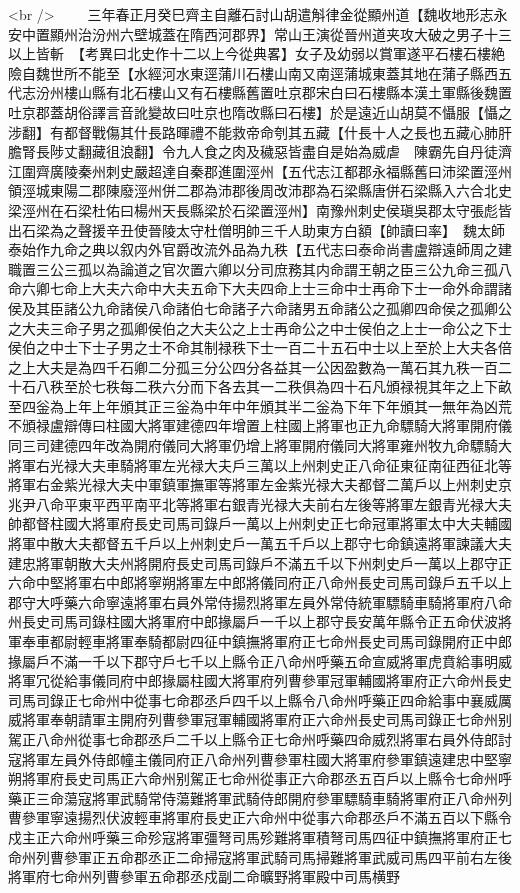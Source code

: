 <br />
　　三年春正月癸巳齊主自離石討山胡遣斛律金從顯州道【魏收地形志永安中置顯州治汾州六壁城蓋在隋西河郡界】常山王演從晉州道夹攻大破之男子十三以上皆斬　【考異曰北史作十二以上今從典畧】女子及幼弱以賞軍遂平石樓石樓絶險自魏世所不能至【水經河水東逕蒲川石樓山南又南逕蒲城東蓋其地在蒲子縣西五代志汾州樓山縣有北石樓山又有石樓縣舊置吐京郡宋白曰石樓縣本漢土軍縣後魏置吐京郡蓋胡俗譯言音訛變故曰吐京也隋改縣曰石樓】於是遠近山胡莫不懾服【懾之涉翻】有都督戰傷其什長路暉禮不能救帝命刳其五藏【什長十人之長也五藏心肺肝膽腎長陟丈翻藏徂浪翻】令九人食之肉及穢惡皆盡自是始為威虐　陳霸先自丹徒濟江圍齊廣陵秦州刺史嚴超達自秦郡進圍涇州【五代志江都郡永福縣舊曰沛梁置涇州領涇城東陽二郡陳廢涇州併二郡為沛郡後周改沛郡為石梁縣唐併石梁縣入六合北史梁涇州在石梁杜佑曰楊州天長縣梁於石梁置涇州】南豫州刺史侯瑱吳郡太守張彪皆出石梁為之聲援辛丑使晉陵太守杜僧明帥三千人助東方白額【帥讀曰率】　魏太師泰始作九命之典以叙内外官爵改流外品為九秩【五代志曰泰命尚書盧辯遠師周之建職置三公三孤以為論道之官次置六卿以分司庶務其内命謂王朝之臣三公九命三孤八命六卿七命上大夫六命中大夫五命下大夫四命上士三命中士再命下士一命外命謂諸侯及其臣諸公九命諸侯八命諸伯七命諸子六命諸男五命諸公之孤卿四命侯之孤卿公之大夫三命子男之孤卿侯伯之大夫公之上士再命公之中士侯伯之上士一命公之下士侯伯之中士下士子男之士不命其制禄秩下士一百二十五石中士以上至於上大夫各倍之上大夫是為四千石卿二分孤三分公四分各益其一公因盈數為一萬石其九秩一百二十石八秩至於七秩每二秩六分而下各去其一二秩俱為四十石凡頒禄視其年之上下畝至四釡為上年上年頒其正三釡為中年中年頒其半二釡為下年下年頒其一無年為凶荒不頒禄盧辯傳曰柱國大將軍建德四年增置上柱國上將軍也正九命驃騎大將軍開府儀同三司建德四年改為開府儀同大將軍仍增上將軍開府儀同大將軍雍州牧九命驃騎大將軍右光禄大夫車騎將軍左光禄大夫戶三萬以上州刺史正八命征東征南征西征北等將軍右金紫光禄大夫中軍鎮軍撫軍等將軍左金紫光禄大夫都督二萬戶以上州刺史京兆尹八命平東平西平南平北等將軍右銀青光禄大夫前右左後等將軍左銀青光禄大夫帥都督柱國大將軍府長史司馬司錄戶一萬以上州刺史正七命冠軍將軍太中大夫輔國將軍中散大夫都督五千戶以上州刺史戶一萬五千戶以上郡守七命鎮遠將軍諫議大夫建忠將軍朝散大夫州將開府長史司馬司錄戶不滿五千以下州刺史戶一萬以上郡守正六命中堅將軍右中郎將寧朔將軍左中郎將儀同府正八命州長史司馬司錄戶五千以上郡守大呼藥六命寧遠將軍右員外常侍揚烈將軍左員外常侍統軍驃騎車騎將軍府八命州長史司馬司錄柱國大將軍府中郎掾屬戶一千以上郡守長安萬年縣令正五命伏波將軍奉車都尉輕車將軍奉騎都尉四征中鎮撫將軍府正七命州長史司馬司錄開府正中郎掾屬戶不滿一千以下郡守戶七千以上縣令正八命州呼藥五命宣威將軍虎賁給事明威將軍冗從給事儀同府中郎掾屬柱國大將軍府列曹參軍冠軍輔國將軍府正六命州長史司馬司錄正七命州中從事七命郡丞戶四千以上縣令八命州呼藥正四命給事中襄威厲威將軍奉朝請軍主開府列曹參軍冠軍輔國將軍府正六命州長史司馬司錄正七命州别駕正八命州從事七命郡丞戶二千以上縣令正七命州呼藥四命威烈將軍右員外侍郎討寇將軍左員外侍郎幢主儀同府正八命州列曹參軍柱國大將軍府參軍鎮遠建忠中堅寧朔將軍府長史司馬正六命州别駕正七命州從事正六命郡丞五百戶以上縣令七命州呼藥正三命蕩寇將軍武騎常侍蕩難將軍武騎侍郎開府參軍驃騎車騎將軍府正八命州列曹參軍寧遠揚烈伏波輕車將軍府長史正六命州中從事六命郡丞戶不滿五百以下縣令戍主正六命州呼藥三命殄寇將軍彊弩司馬殄難將軍積弩司馬四征中鎮撫將軍府正七命州列曹參軍正五命郡丞正二命掃寇將軍武騎司馬掃難將軍武威司馬四平前右左後將軍府七命州列曹參軍五命郡丞戍副二命曠野將軍殿中司馬横野